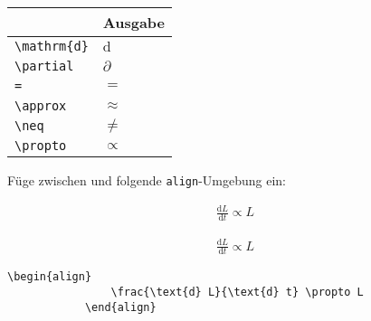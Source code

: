 \documentclass["WS\space 16-17\space -\space LaTeX-Kurs\space -\space Praesentation\space -\space 1.tex"]{subfiles}
\begin{document}
\begin{frame}[fragile]
	\begin{center}
		\begin{tabular}{ll}
			\toprule
			\color{math-cmd}{Mathe}\color{black}{-Befehl}							&	Ausgabe					\\ \midrule
			\lstinline|\mathrm{d}|		&	$\mathrm{d}$		\\
			\lstinline|\partial|		&	$\partial$		
			\\
			\lstinline|=|		&	$=$		
      \\
			\lstinline|\approx|		&	$\approx$		
			\\
			\lstinline|\neq|					&	$\neq$		\\
      \lstinline|\propto|					&	$\propto$		\\
			\bottomrule
		\end{tabular}
	\end{center}
	\pause\btVFill
	\Aufgabee
	Füge zwischen  und  folgende \lstinline[basicstyle=\normalfont\normalsize]|align|-Umgebung ein:
	\begin{outputbox}
	    \begin{align}
	        \frac{\text{d} L}{\text{d} t} \propto L \tag{3}
	    \end{align}	
    \end{outputbox}
	\vspace{0.3cm}
\end{frame}
\begin{frame}[fragile]
	\Losung
		\begin{outputbox}
		    \begin{align}
		      \frac{\text{d} L}{\text{d} t} \propto L  \tag{3}
		    \end{align}
		\end{outputbox}
	\Code
		\begin{lstlisting}[gobble=12]
		    \begin{align}
		        \frac{\text{d} L}{\text{d} t} \propto L 
		    \end{align}
		\end{lstlisting}
\end{frame}
\end{document}
